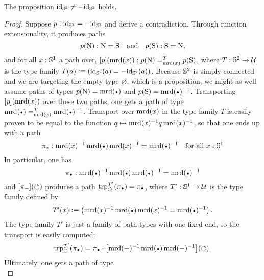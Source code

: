 \documentclass[english,a4paper]{lmcs}
\begin{document}
\begin{lem}
  \label{lemma:S2-id-neq-minusid}%
  The proposition $\mathord{\mathrm{id}}_{{\mathbb S^{2}}} \neq -\mathord{\mathrm{id}}_{{\mathbb S^{2}}}$ holds.
\end{lem}
\begin{proof}
  Suppose $p:\mathord{\mathrm{id}}_{{\mathbb S^{2}}} = -\mathord{\mathrm{id}}_{{\mathbb S^{2}}}$ and derive a contradiction. Through
  function extensionality, it produces paths
  \begin{displaymath}
    p(\mathrm{N}) : \mathrm{N} = \mathrm{S}
    \quad\text{and}\quad
    p(\mathrm{S}) : \mathrm{S} = \mathrm{N},
  \end{displaymath}
  and for all $x:{{\mathbb S^{1}}}$ a path over,
  $\mathop{\left[{p}\right]} (\operatorname{\mathrm{mrd}}(x)): p(\mathrm{N}) =^{T}_{\operatorname{\mathrm{mrd}}(x)} p(\mathrm{S})$, where
  $T: {{\mathbb S^{2}}} \to \mathcal{U}$ is the type family
  $T(a)\vcentcolon\equiv (\mathord{\mathrm{id}}_{{\mathbb S^{2}}}(a) = -\mathord{\mathrm{id}}_{{\mathbb S^{2}}}(a))$. Because ${{\mathbb S^{2}}}$ is simply
  connected and we are targeting the empty type $\varnothing$, which
  is a proposition, we might as well assume paths of types $p(\north)=\mrd(\base)$
  and $p(\south) = \inv{\mrd(\base)}$. Transporting $\mathop{\left[{p}\right]}(\operatorname{\mathrm{mrd}}(x))$ over
  these two paths, one gets a path of type
  $\pathover {\mrd(\base)} T {\mrd(x)} {\inv{\mrd(\base)}}$.
  Transport over $\operatorname{\mathrm{mrd}}(x)$ in the type family $T$ is
  easily proven to be equal to the function
  $q \mapsto \operatorname{\mathrm{mrd}}(x)^{-1} q \operatorname{\mathrm{mrd}}(x)^{-1}$, so that one
  ends up with a path
  \begin{displaymath}
    \pi_x\from \inv{\mrd(x)} \mrd(\base) \inv{\mrd(x)} = \inv{\mrd(\base)}
    \quad
    \text{for all }x\from\Sc
  \end{displaymath}
  In particular, one has
  \begin{displaymath}
    \pi_{\base} \from \inv{\mrd(\base)} \mrd(\base) \inv{\mrd(\base)}
    = \inv{\mrd(\base)}
  \end{displaymath}
  and $\mathop{\left[{\pi_{\mathord{{-}}}}\right]} (\mathord{\circlearrowleft})$ produces a path
  $\trp [T'] \Sloop (\pi_{\base}) = \pi_{\base}$, where $T':{{\mathbb S^{1}}}\to\mathcal{U}$
  is the type family defined by
  \begin{displaymath}
    T'(x) \defequi \left(\inv{\mrd(x)}\mrd(\base)\inv{\mrd(x)}
      = \inv{\mrd(\base)} \right).
  \end{displaymath}
  The type family $T'$ is just a family of path-types with one fixed
  end, so the transport is easily computed:
  \begin{displaymath}
    \trp [T'] \Sloop (\pi_{\base}) = \pi_{\base} \cdot
    \ap{\inv{\mrd(\blank)} \mrd(\base) \inv{\mrd(\blank)}}(\Sloop).
  \end{displaymath}
  Ultimately, one gets a path of type
  \begin{displaymath}

\end{displaymath}
\end{proof}
\end{document}
